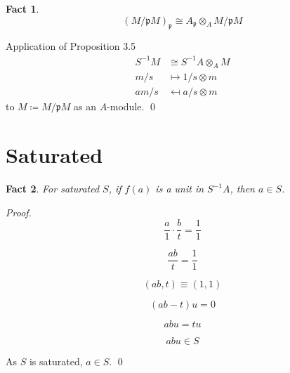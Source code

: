 \documentclass{article}
\newcommand{\mf}{\mathfrak}
\newcommand{\ppp}{\mf p}
\newtheorem{theorem}{Fact}[section]
\begin{document}
\begin{theorem}
\[
(M / \ppp M)_\ppp \cong A_\ppp \otimes_A M/\ppp M
\]
\end{theorem}
Application of Proposition 3.5
\begin{align*}
S^{-1}M & \cong S^{-1}A \otimes_A M \\
m/s & \mapsto 1/s \otimes m \\
am/s & \mapsfrom a/s \otimes m 
\end{align*}
to $M \coloneqq M/\ppp M$ as an $A$-module. 
\qed



\section{Saturated}

\begin{theorem}
For saturated $S$, if $f(a)$ is a unit in $S^{-1}A$, then $a \in S$.
\end{theorem}

\noindent
\textit{Proof.}
\[
  \frac{a}{1} \cdot \frac{b}{t} = \frac{1}{1} 
\]

\[
  \frac{ab}{t} = \frac{1}{1}
\]

\[
   (ab, t) \equiv (1, 1)
\]
 
\[
   (ab - t)u = 0
\]

\[
   abu = tu
\]

\[
   abu \in S
\]

As \( S \) is saturated, \( a \in S \).  \qed
\end{document}
